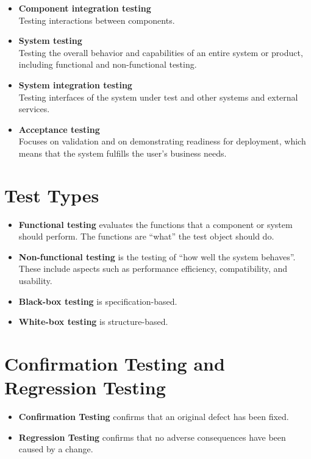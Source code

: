 \documentclass{article}
\begin{document}
\begin{multicols}{3}
{\begin{itemize}
  \item \textbf{Component integration testing}\\
  Testing interactions between components.
  
  \item \textbf{System testing}\\
  Testing the overall behavior and capabilities of an entire system or product, including functional and non-functional testing.
  
  \item \textbf{System integration testing}\\
  Testing interfaces of the system under test and other systems and external services.
  
  \item \textbf{Acceptance testing}\\
  Focuses on validation and on demonstrating readiness for deployment, which means that the system fulfills the user’s business needs.
\end{itemize}

\section*{Test Types}
\begin{itemize}
  \item \textbf{Functional testing} evaluates the functions that a component or system should perform. The functions are “what” the test object should do.
  \item \textbf{Non-functional testing} is the testing of “how well the system behaves”. These include aspects such as performance efficiency, compatibility, and usability.
  \item \textbf{Black-box testing} is specification-based.
  \item \textbf{White-box testing} is structure-based.
\end{itemize}

\section*{Confirmation Testing and Regression Testing}
\begin{itemize}
  \item \textbf{Confirmation Testing} confirms that an original defect has been fixed.
  \item \textbf{Regression Testing} confirms that no adverse consequences have been caused by a change.
\end{itemize}

}
\end{multicols}
\end{document}
